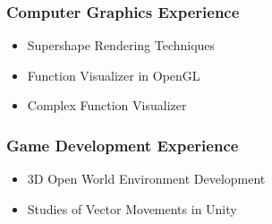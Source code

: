             \subsubsection{Computer Graphics Experience}
                \begin{itemize} 
                    \item Supershape Rendering Techniques 
                    \item Function Visualizer in OpenGL 
                    \item Complex Function Visualizer 
                \end{itemize}

            \subsubsection{Game Development Experience} 
                \begin{itemize} 
                    \item 3D Open World Environment Development 
                    \item Studies of Vector Movements in Unity 
                \end{itemize}


